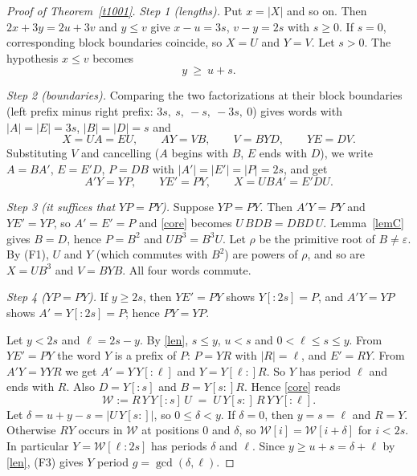 \documentclass[10pt]{article}
\newcommand{\eps}{\varepsilon}
\theoremstyle{remark}\newtheorem*{remark}{Remark}
\begin{document}
\begin{proof}[Proof of Theorem~\ref{t1001}]
\emph{Step 1 (lengths).} Put \(x=|X|\) and so on. Then \(2x+3y=2u+3v\) and \(y\le v\) give \(x-u=3s\), \(v-y=2s\) with \(s\ge0\). If \(s=0\), corresponding block boundaries coincide, so \(X=U\) and \(Y=V\). Let \(s>0\). The hypothesis \(x\le v\) becomes
\begin{equation}\label{len}
 y\ \ge\ u+s .
\end{equation}

\emph{Step 2 (boundaries).} Comparing the two factorizations at their block boundaries (left prefix minus right prefix: \(3s,\ s,\ -s,\ -3s,\ 0\)) gives words with \(|A|=|E|=3s\), \(|B|=|D|=s\) and
\[
 X=UA=EU,\qquad AY=VB,\qquad V=BYD,\qquad YE=DV .
\]
Substituting \(V\) and cancelling (\(A\) begins with \(B\), \(E\) ends with \(D\)), we write \(A=BA'\), \(E=E'D\), \(P=DB\) with \(|A'|=|E'|=|P|=2s\), and get
\begin{equation}\label{core}
 A'Y=YP,\qquad YE'=PY,\qquad X=UBA'=E'DU .
\end{equation}

\emph{Step 3 (it suffices that \(YP=PY\)).} Suppose \(YP=PY\). Then \(A'Y=PY\) and \(YE'=YP\), so \(A'=E'=P\) and \eqref{core} becomes \(U\,BDB=DBD\,U\). Lemma~\ref{lemC} gives \(B=D\), hence \(P=B^2\) and \(UB^3=B^3U\). Let \(\rho\) be the primitive root of \(B\ne\eps\). By (F1), \(U\) and \(Y\) (which commutes with \(B^2\)) are powers of \(\rho\), and so are \(X=UB^3\) and \(V=BYB\). All four words commute.

\emph{Step 4 (\(YP=PY\)).} If \(y\ge2s\), then \(YE'=PY\) shows \(Y[{:}2s]=P\), and \(A'Y=YP\) shows \(A'=Y[{:}2s]=P\); hence \(PY=YP\).

Let \(y<2s\) and \(\ell=2s-y\). By \eqref{len}, \(s\le y\), \(u<s\) and \(0<\ell\le s\le y\). From \(YE'=PY\) the word \(Y\) is a prefix of \(P\): \(P=YR\) with \(|R|=\ell\), and \(E'=RY\). From \(A'Y=YYR\) we get \(A'=Y\,Y[{:}\ell]\) and \(Y=Y[\ell{:}]R\). So \(Y\) has period \(\ell\) and ends with \(R\). Also \(D=Y[{:}s]\) and \(B=Y[s{:}]R\). Hence \eqref{core} reads
\[
 \mathcal W:=R\,Y\,Y[{:}s]\,U\;=\;U\,Y[s{:}]\,R\,Y\,Y[{:}\ell].
\]
Let \(\delta=u+y-s=|U\,Y[s{:}]|\), so \(0\le\delta<y\). If \(\delta=0\), then \(y=s=\ell\) and \(R=Y\). Otherwise \(RY\) occurs in \(\mathcal W\) at positions \(0\) and \(\delta\), so \(\mathcal W[i]=\mathcal W[i+\delta]\) for \(i<2s\). In particular \(Y=\mathcal W[\ell{:}2s]\) has periods \(\delta\) and \(\ell\). Since \(y\ge u+s=\delta+\ell\) by \eqref{len}, (F3) gives \(Y\) period \(g=\gcd(\delta,\ell)\).


\end{proof}
\end{document}

